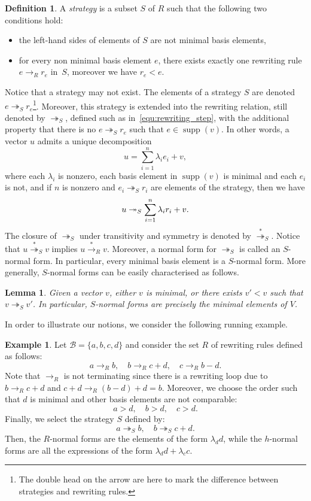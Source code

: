 \documentclass[10pt]{easychair}
\newtheorem{lemma}[theorem]{Lemma}
\theoremstyle{definition}
\newtheorem{definition}[theorem]{Definition}
\newtheorem{example}[theorem]{Example}
\DeclareMathOperator{\supp}{supp}
\newcommand\basis{\mathscr{B}}
\newcommand\rewR{\to_R}
\newcommand\rewS{\twoheadrightarrow_S}
\newcommand\transR{\overset{*}{\to}_R}
\newcommand\transS{\overset{*}{\twoheadrightarrow}_S}
\begin{document}
\begin{definition}
  A \emph{strategy} is a subset $S$ of $R$ such that the following
  two conditions hold:
  \begin{itemize}
  \item the left-hand sides of elements of $S$ are not minimal basis
    elements,
  \item for every non minimal basis element $e$, there exists exactly one
    rewriting rule $e\rewR r_e$ in~$S$, moreover we have $r_e<e$.
  \end{itemize}
\end{definition}
\smallskip

Notice that a strategy may not exist. The elements of a strategy $S$ are
denoted~$e\rewS r_e$\footnote{The double head on the arrow are here to
  mark the difference between strategies and rewriting rules.}. Moreover,
this strategy is extended into the rewriting relation, still denoted by
$\rewS$, defined such as in~\eqref{equ:rewriting_step}, with the
additional property that there is no $e\rewS r_e$ such that
$e\in\supp(v)$. In other words, a vector $u$ admits a unique
decomposition
\[u=\sum_{i=1}^n\lambda_ie_i+v,\]
where each $\lambda_i$ is nonzero, each basis element in $\supp(v)$ is
minimal and each $e_i$ is not, and if $n$ is nonzero and $e_i\rewS r_i$
are elements of the strategy, then we have 
\[u\rewS\sum_{i=1}^n\lambda_ir_i+v.
  \smallskip\]
The closure of $\rewS$ under transitivity and symmetry is denoted by
$\transS$. Notice that $u\transS v$ implies $u\transR v$. Moreover, a
normal form for $\rewS$ is called an $S$-normal form. In particular,
every minimal basis element is a $S$-normal form. More generally,
$S$-normal forms can be easily characterised as follows.
\medskip

\begin{lemma}\label{lem:h_normal_forms}
  Given a vector $v$, either $v$ is minimal, or there exists $v'<v$ such
  that $v\rewS v'$. In particular, $S$-normal forms are precisely the
  minimal elements of $V$. 
\end{lemma}
\smallskip

In order to illustrate our notions, we consider the following running
example.
\smallskip

\begin{example}\label{ex:h_norma_form}
  Let $\basis=\{a,b,c,d\}$ and consider the set $R$ of rewriting rules
  defined as follows:
  \[a\rewR b,\quad b\rewR c+d,\quad c\rewR b-d.\]
  Note that $\rewR$ is not terminating since there is a rewriting loop
  due to $b\rewR c+d$ and $c+d\rewR (b-d)+d=b$. Moreover, we choose the
  order such that $d$ is minimal and other basis elements are not
  comparable:
  \[a>d,\quad b>d,\quad c>d.\]
  Finally, we select the strategy $S$ defined by:
  \[a\rewS b,\quad b\rewS c+d.\]
  Then, the $R$-normal forms are the elements of the form $\lambda_dd$,
  while the $h$-normal forms are all the expressions of the form
  $\lambda_dd+\lambda_cc$.
\end{example}
\smallskip
\end{document}
